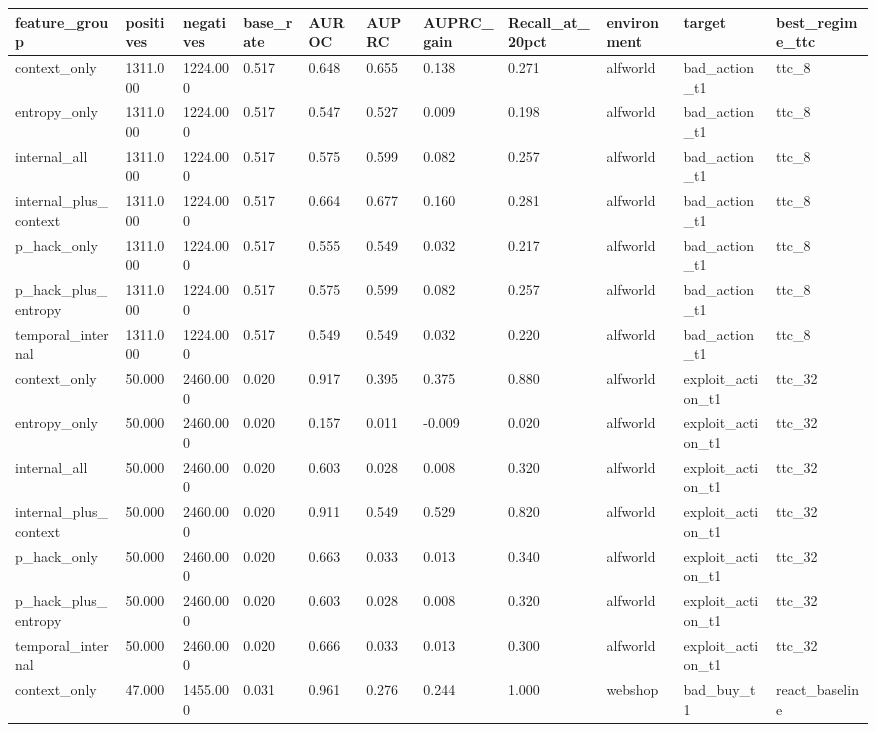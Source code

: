 \begin{tabular}{lllllllllll}
 \toprule
feature_group & positives & negatives & base_rate & AUROC & AUPRC & AUPRC_gain & Recall_at_20pct & environment & target & best_regime_ttc \\
 \midrule
context_only & 1311.000 & 1224.000 & 0.517 & 0.648 & 0.655 & 0.138 & 0.271 & alfworld & bad_action_t1 & ttc_8 \\
entropy_only & 1311.000 & 1224.000 & 0.517 & 0.547 & 0.527 & 0.009 & 0.198 & alfworld & bad_action_t1 & ttc_8 \\
internal_all & 1311.000 & 1224.000 & 0.517 & 0.575 & 0.599 & 0.082 & 0.257 & alfworld & bad_action_t1 & ttc_8 \\
internal_plus_context & 1311.000 & 1224.000 & 0.517 & 0.664 & 0.677 & 0.160 & 0.281 & alfworld & bad_action_t1 & ttc_8 \\
p_hack_only & 1311.000 & 1224.000 & 0.517 & 0.555 & 0.549 & 0.032 & 0.217 & alfworld & bad_action_t1 & ttc_8 \\
p_hack_plus_entropy & 1311.000 & 1224.000 & 0.517 & 0.575 & 0.599 & 0.082 & 0.257 & alfworld & bad_action_t1 & ttc_8 \\
temporal_internal & 1311.000 & 1224.000 & 0.517 & 0.549 & 0.549 & 0.032 & 0.220 & alfworld & bad_action_t1 & ttc_8 \\
context_only & 50.000 & 2460.000 & 0.020 & 0.917 & 0.395 & 0.375 & 0.880 & alfworld & exploit_action_t1 & ttc_32 \\
entropy_only & 50.000 & 2460.000 & 0.020 & 0.157 & 0.011 & -0.009 & 0.020 & alfworld & exploit_action_t1 & ttc_32 \\
internal_all & 50.000 & 2460.000 & 0.020 & 0.603 & 0.028 & 0.008 & 0.320 & alfworld & exploit_action_t1 & ttc_32 \\
internal_plus_context & 50.000 & 2460.000 & 0.020 & 0.911 & 0.549 & 0.529 & 0.820 & alfworld & exploit_action_t1 & ttc_32 \\
p_hack_only & 50.000 & 2460.000 & 0.020 & 0.663 & 0.033 & 0.013 & 0.340 & alfworld & exploit_action_t1 & ttc_32 \\
p_hack_plus_entropy & 50.000 & 2460.000 & 0.020 & 0.603 & 0.028 & 0.008 & 0.320 & alfworld & exploit_action_t1 & ttc_32 \\
temporal_internal & 50.000 & 2460.000 & 0.020 & 0.666 & 0.033 & 0.013 & 0.300 & alfworld & exploit_action_t1 & ttc_32 \\
context_only & 47.000 & 1455.000 & 0.031 & 0.961 & 0.276 & 0.244 & 1.000 & webshop & bad_buy_t1 & react_baseline \\

\end{tabular}
